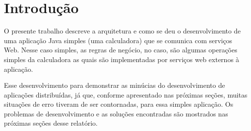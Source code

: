 %


\chapter{Introdução}

O presente trabalho descreve a arquitetura e como se deu o desenvolvimento de
uma aplicação Java simples (uma calculadora) que se comunica com serviços Web.
Nesse caso simples, as regras de negócio, no caso, são algumas operações simples
da calculadora as quais são implementadas por serviços web externos à aplicação.

Esse desenvolvimento  para demonstrar as minúcias do desenvolvimento de
aplicações distribuídas, já que, conforme apresentado nas próximas seções,
muitas situações de erro tiveram de ser contornadas, para essa simples
aplicação. Os problemas de desenvolvimento e as soluções encontradas são
mostrados nas próximas seções desse relatório.
